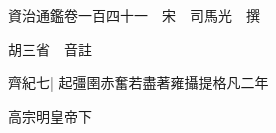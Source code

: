 






























































資治通鑑卷一百四十一　宋　司馬光　撰

胡三省　音註

齊紀七|{
	起彊圉赤奮若盡著雍攝提格凡二年}


高宗明皇帝下

